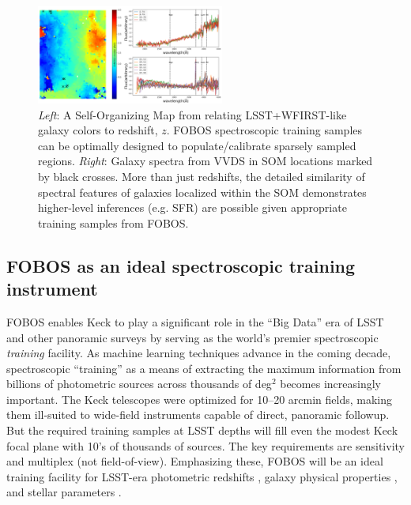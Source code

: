
\begin{figure} %
\includegraphics[width=0.55\textwidth]{figs/Hemmati18_Fig8_VVDS_spec.png}
\caption{\small {\it Left}: A Self-Organizing Map
\citep[SOM;][]{1990Natur.346...24K} from \citet{hemmati18} relating
LSST+WFIRST-like galaxy colors to redshift, $z$. FOBOS spectroscopic
training samples can be optimally designed to populate/calibrate
sparsely sampled regions. {\it Right}: Galaxy spectra from VVDS
\citep{2005A&A...439..845L} in SOM locations marked by black crosses.
More than just redshifts, the detailed similarity of spectral
features of galaxies localized within the SOM demonstrates
higher-level inferences (e.g. SFR) are possible given appropriate
training samples from FOBOS.} \label{fig:SOM} \end{figure}

\subsection{FOBOS as an ideal spectroscopic training instrument}
\label{sec:datascience}

FOBOS enables Keck to play a significant role in the ``Big Data'' era
of LSST and other panoramic surveys by serving as the world's premier
spectroscopic \emph{training} facility. As machine learning
techniques advance in the coming decade, spectroscopic ``training''
as a means of extracting the maximum information from billions of
photometric sources across thousands of deg$^2$ becomes increasingly
important. The Keck telescopes were optimized for 10--20 arcmin
fields, making them ill-suited to wide-field instruments capable of
direct, panoramic followup. But the required training samples at LSST
depths will fill even the modest Keck focal plane with 10's of
thousands of sources. The key requirements are sensitivity and
multiplex (not field-of-view). Emphasizing these, FOBOS will be an
ideal training facility for LSST-era photometric redshifts
\citep[see][]{salvato19}, galaxy physical properties
\citep[e.g.,][]{davidzon19}, and stellar parameters
\citep[e.g.,][]{2018arXiv180401530T}.

